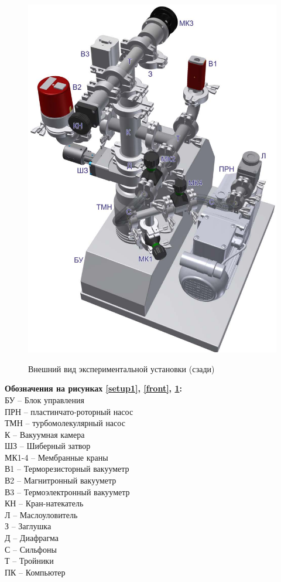 \documentclass[a4paper,12pt]{article} %
\begin{document}
\begin{figure}[h]
\begin{center}
\begin{minipage}[h]{0.45\linewidth}
	\includegraphics[width=1\linewidth]{fig2.jpg}
	\label{back}
	\caption{Внешний вид экспериментальной установки (сзади)}
\end{minipage}
\end{center}
\end{figure}

\noindent \textbf{Обозначения на рисунках \ref{setup1}, \ref{front}, \ref{back}:}\\
БУ -- Блок управления \\
ПРН -- пластинчато-роторный насос  \\
ТМН -- турбомолекулярный насос \\
К -- Вакуумная камера \\
ШЗ -- Шиберный затвор \\
МК1-4 -- Мембранные краны \\
В1 -- Терморезисторный вакууметр \\
В2 -- Магнитронный вакууметр \\
В3 -- Термоэлектронный вакууметр \\
КН -- Кран-натекатель \\
Л -- Маслоуловитель \\
З -- Заглушка \\
Д -- Диафрагма \\
С -- Сильфоны \\
Т -- Тройники \\
ПК -- Компьютер \\
\end{document}
